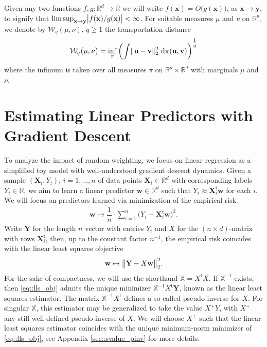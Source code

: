 \documentclass{article}
\newcommand*{\R}{\mathbb{R}}
\newcommand*{\bbX}{\mathbb{X}}
\newcommand*{\bfX}{\mathbf{X}}
\newcommand*{\bfY}{\mathbf{Y}}
\newcommand*{\bfu}{\mathbf{u}}
\newcommand*{\bfv}{\mathbf{v}}
\newcommand*{\bfw}{\mathbf{w}}
\newcommand*{\bfx}{\mathbf{x}}
\newcommand*{\bfy}{\mathbf{y}}
\newcommand*{\calW}{\mathcal{W}}
\newcommand*{\inv}{^{-1}}
\newcommand*{\pinv}{^{+}}
\newcommand*{\tran}{^{\mathsf{t}}}
\DeclarePairedDelimiter{\abs}{\lvert}{\rvert}
\DeclarePairedDelimiter{\norm}{\lVert}{\rVert}
\newcommand*{\rmd}{\mathrm{d}}
\newcommand{\weight}{\bfw}
\begin{document}
Given any two functions $f, g : \R^d \to \R$ we will write $f(\bfx) =
O\big(g(\bfx)\big)$, as $\bfx \to \bfy$, to signify that $\limsup_{\bfx \to
\bfy} \abs[\big]{f(\bfx) / g(\bfx)} < \infty$. For suitable measures $\mu$ and
$\nu$ on $\R^d$, we denote by $\calW_q(\mu, \nu)$, $q \geq 1$ the transportation
distance
\begin{align*}
  \calW_q\big(\mu, \nu\big) = \inf_\pi \left(\int \norm{\bfu - \bfv}_2^2\ \rmd
  \pi(\bfu, \bfv)\right)^{\tfrac{1}{q}}
\end{align*} where the infimum is taken over all measures $\pi$ on $\R^d \times
\R^d$ with marginals $\mu$ and $\nu$.

\section{Estimating Linear Predictors with Gradient Descent}
\label{sec::grad_desc}

To analyze the impact of random weighting, we focus on linear regression as a
simplified toy model with well-understood gradient descent dynamics. Given a
sample $(\bfX_i, Y_i)$, $i = 1, \ldots, n$ of data points $\bfX_i \in \R^d$ with
corresponding labels $Y_i \in \R$, we aim to learn a linear predictor $\bfw \in
\R^d$ such that $Y_i \approx \bfX_i\tran \bfw$ for each $i$. We will focus on
predictors learned via minimization of the empirical risk \begin{align*}
  \weight \mapsto \dfrac{1}{n} \cdot \sum_{i = 1}^n \big(Y_i - \bfX_i\tran
  \weight\big)^2.
\end{align*} Write $\bfY$ for the length $n$ vector with entries $Y_i$ and $X$
for the $(n \times d)$-matrix with rows $\bfX_i\tran$, then, up to the constant
factor $n\inv$, the empirical risk coincides with the linear least squares
objective \begin{align}
  \label{eq::lls_obj}
  \weight \mapsto \norm[\big]{\bfY - X \weight}_2^2.
\end{align} For the sake of compactness, we will use the shorthand $\bbX =
X\tran X$. If $\bbX\inv$ exists, then \eqref{eq::lls_obj} admits the unique
minimizer $\bbX\inv X\tran \bfY$, known as the linear least squares estimator.
The matrix $\bbX\inv X\tran$ defines a so-called pseudo-inverse for $X$. For
singular $\bbX$, this estimator may be generalized to take the value $X\pinv Y$,
with $X\pinv$ any still well-defined pseudo-inverse of $X$. We will choose
$X\pinv$ such that the linear least squares estimator coincides with the unique
minimum-norm minimizer of \eqref{eq::lls_obj}, see Appendix
\ref{sec::svalue_pinv} for more details.
\end{document}
